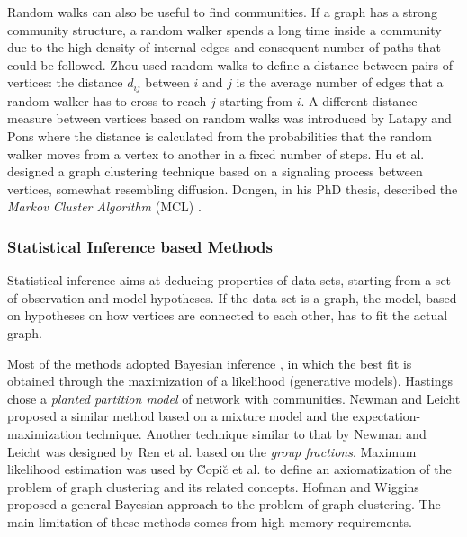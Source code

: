 Random walks \cite{hughes1995} can also be useful to find communities. If a graph has a strong community structure, a random walker spends a
long time inside a community due to the high density of internal edges and consequent number of paths that could be followed. Zhou
\cite{Zhou:2003a} used random walks to define a distance between pairs of vertices: the distance $d_{ij}$ between $i$ and $j$ is the
average number of edges that a random walker has to cross to reach $j$ starting from $i$.  A different distance measure between vertices
based on random walks was introduced by Latapy and Pons \cite{Yolum} where the
distance is
calculated from the probabilities that the random walker moves from a vertex to another in a fixed number of steps. Hu et al.
\cite{Hu026121} designed a graph clustering technique based on a signaling process between vertices, somewhat resembling diffusion. Dongen,
in his PhD thesis, described the {\em Markov Cluster Algorithm} (MCL) \cite{vandongen00}.

\subsubsection*{Statistical Inference based Methods}\label{info}
Statistical inference aims at deducing properties of data sets, starting from a set of observation and model hypotheses.
If the data set is a graph, the model, based on hypotheses on how vertices are connected to each other, has to fit the actual graph.

Most of the methods adopted Bayesian inference \cite{winkler1972}, in which the best fit is obtained through the maximization of a
likelihood (generative models). Hastings \cite{Hastings035102} chose a {\em planted partition model} of network with communities.
Newman and Leicht \cite{Newman05062007} proposed a similar method based on a mixture model and the expectation-maximization
technique. Another technique similar to that by Newman and Leicht was designed by Ren et al. \cite{Ren036111} based on the {\em group
fractions}.
Maximum likelihood estimation was used by \u{C}opi\u{c} et al. \cite{Μcopi05} to define an axiomatization of the problem of graph
clustering and its related concepts.  Hofman and Wiggins \cite{Hofman2007} proposed a general Bayesian approach to the
problem of graph clustering. The main limitation of these methods comes from high memory requirements.

